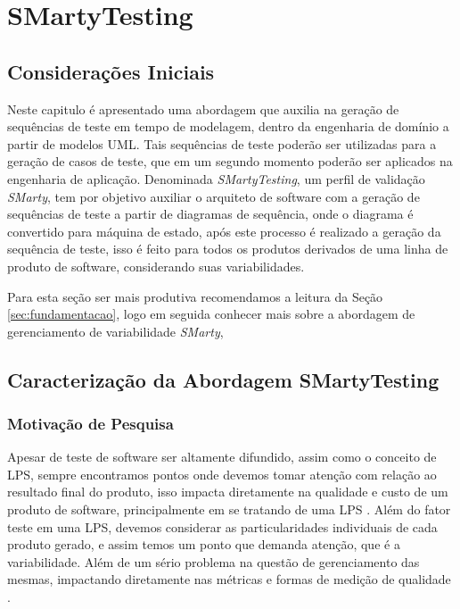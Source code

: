 \chapter{SMartyTesting}
\label{sec:abordagem}
\pagestyle{plain}

\section{Considerações Iniciais}

Neste capitulo é apresentado uma abordagem que auxilia na geração de sequências de teste em tempo de modelagem, dentro da engenharia de domínio a partir de modelos UML. Tais sequências de teste poderão ser utilizadas para a geração de casos de teste, que em um segundo momento poderão ser aplicados na engenharia de aplicação. Denominada \textit{SMartyTesting}, um perfil de validação \textit{SMarty}, tem por objetivo auxiliar o arquiteto de software com a geração de sequências de teste a partir de diagramas de sequência, onde o diagrama é convertido para máquina de estado, após este processo é realizado a geração da sequência de teste, isso é feito para todos os produtos derivados de uma linha de produto de software, considerando suas variabilidades.

Para esta seção ser mais produtiva recomendamos a leitura da Seção \ref{sec:fundamentacao}, logo em seguida conhecer mais sobre a abordagem de gerenciamento de variabilidade \textit{SMarty},   

\section{Caracterização da Abordagem SMartyTesting}
\label{caracterizacao_smarty}

\subsection{Motivação de Pesquisa}

Apesar de teste de software ser altamente difundido, assim como o conceito de LPS, sempre encontramos pontos onde devemos tomar atenção com relação ao resultado final do produto, isso impacta diretamente na qualidade e custo de um produto de software, principalmente em se tratando de uma LPS \cite{engstrom2011testing}. Além do fator teste em uma LPS, devemos considerar as particularidades individuais de cada produto gerado, e assim temos um ponto que demanda atenção, que é a variabilidade. Além de um sério problema na questão de gerenciamento das mesmas, impactando diretamente nas métricas e formas de medição de qualidade \cite{junior2013systematic}. 

